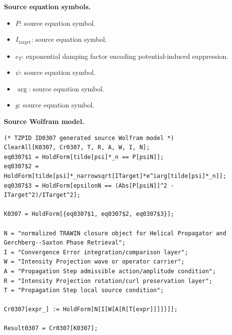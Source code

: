 \begin{minipage}[t]{0.49\linewidth}
\begingroup
\small
\raggedright
\textbf{Source equation symbols.}\par
\begin{itemize}[leftmargin=1.35em,itemsep=1pt,topsep=1pt,parsep=0pt]
    \item $P$: source equation symbol.
    \item $I_{\mathrm{target}}$: source equation symbol.
    \item $e_T$: exponential damping factor encoding potential-induced suppression.
    \item $\psi$: source equation symbol.
    \item $\arg$: source equation symbol.
    \item $g$: source equation symbol.
\end{itemize}
\endgroup
\end{minipage}\hfill
\begin{minipage}[t]{0.47\linewidth}
\begingroup
\scriptsize
\raggedright
\textbf{Source Wolfram model.}\par
\begin{Verbatim}[fontsize=\tiny,breaklines=true,breakanywhere=true]
(* TZPID ID0307 generated source Wolfram model *)
ClearAll[K0307, Cr0307, T, R, A, W, I, N];
eq0307$1 = HoldForm[tilde[psi]*_n == P[psiN]];
eq0307$2 = HoldForm[tilde[psi]*_narrowsqrt[ITarget]*e^iarg[tilde[psi]*_n]];
eq0307$3 = HoldForm[epsilonN == (Abs[P[psiN]]^2 - ITarget^2)/ITarget^2];

K0307 = HoldForm[{eq0307$1, eq0307$2, eq0307$3}];

N = "normalized TRAWIN closure object for Helical Propagator and Gerchberg--Saxton Phase Retrieval";
I = "Convergence Error integration/comparison layer";
W = "Intensity Projection wave or operator carrier";
A = "Propagation Step admissible action/amplitude condition";
R = "Intensity Projection rotation/curl preservation layer";
T = "Propagation Step local source condition";

Cr0307[expr_] := HoldForm[N[I[W[A[R[T[expr]]]]]]];

Result0307 = Cr0307[K0307];
\end{Verbatim}
\endgroup
\end{minipage}

